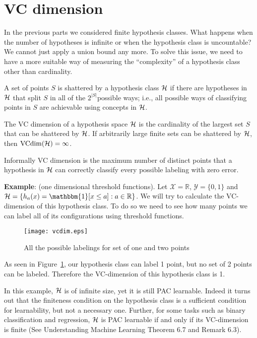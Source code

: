 \documentclass{article}
\begin{document}
\section{VC dimension}
In the previous parts we considered finite hypothesis classes. What happens when the number of hypotheses is infinite or when the hypothesis class is uncountable? We cannot just apply a union bound any more. To solve this issue, we need to have a more suitable way of measuring the “complexity” of a hypothesis class other than cardinality.
\begin{defn}[Shattering]
A set of points $S$ is shattered by a hypothesis class $\HH$ if there are hypotheses in $\HH$ that split $S$ in all of the $2^{|S|}$possible ways; i.e., all possible ways of classifying points in $S$ are achievable using concepts in $\HH$. 
\end{defn}
\begin{defn}[VC dimension of $\HH$]
The VC dimension of a hypothesis space $\HH$ is the cardinality of the largest set $S$ that can be shattered by $\HH$. If arbitrarily large finite sets can be shattered by $\HH$, then $\mathrm{VCdim}(\mathcal{H}) = \infty$.
\end{defn}
Informally VC dimension is the maximum number of distinct points that a hypothesis in $\HH$ can correctly classify every possible labeling with zero error.

\textbf{Example}: (one dimensional threshold functions). Let $\mathcal{X} =  \mathbb{R}$, $\mathcal{Y} = \{0,1\}$ and $\HH = \{h_a(x) = \mathbbm{1}[x \leq a]: a \in \mathbb{R}\}$. We will try to calculate the VC-dimension of this hypothesis class. To do so we need to see how many points we can label all of its configurations using threshold functions.

\begin{figure}[ht]
\centering 
\texttt{[image: vcdim.eps]}
\caption{All the possible labelings for set of one and two points}
\label{fig:vcdim}
\end{figure}

As seen in Figure~\ref{fig:vcdim}, our hypothesis class can label 1 point, but no set of 2 points can be labeled. Therefore the VC-dimension of this hypothesis class is 1. 

In this example, $\HH$ is of infinite size, yet it is still PAC learnable. Indeed it turns out that the finiteness condition on the hypothesis class is a sufficient condition for learnability, but not a necessary one. Further, for some tasks such as binary classification and regression, $\HH$ is PAC learnable if and only if its VC-dimension is finite (See Understanding Machine Learning \cite{Shalev-Shwartz:2014:UML:2621980} Theorem 6.7 and Remark 6.3). 





\end{document}
